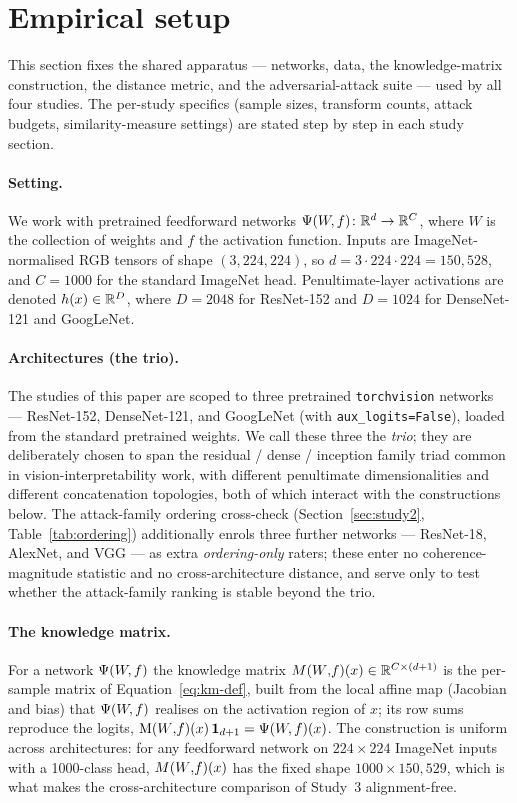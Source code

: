 \section{Empirical setup}
\label{sec:setup}

This section fixes the shared apparatus --- networks, data, the knowledge-matrix
construction, the distance metric, and the adversarial-attack suite --- used by
all four studies. The per-study specifics (sample sizes, transform counts, attack
budgets, similarity-measure settings) are stated step by step in each study
section.

\paragraph{Setting.}
We work with pretrained feedforward networks $\Psi(W\!,f) \colon \mathbb{R}^d \to \mathbb{R}^C$,
where $W$ is the collection of weights and $f$ the activation function.
Inputs are ImageNet-normalised RGB tensors of shape $(3, 224, 224)$,
so $d = 3 \cdot 224 \cdot 224 = 150{,}528$, and $C = 1000$ for the
standard ImageNet head. Penultimate-layer activations are denoted
$h(x) \in \mathbb{R}^D$, where $D = 2048$ for ResNet-152 and $D = 1024$ for
DenseNet-121 and GoogLeNet.

\paragraph{Architectures (the trio).}
The studies of this paper are scoped to three pretrained
\texttt{torchvision} networks --- ResNet-152, DenseNet-121, and GoogLeNet
(with \texttt{aux\_logits=False}), loaded from the standard pretrained
weights. We call these three the \emph{trio}; they are deliberately chosen
to span the residual / dense / inception family triad common in
vision-interpretability work, with different penultimate dimensionalities
and different concatenation topologies, both of which interact with the
constructions below. The attack-family ordering cross-check
(Section~\ref{sec:study2}, Table~\ref{tab:ordering}) additionally enrols
three further networks --- ResNet-18, AlexNet, and VGG --- as extra
\emph{ordering-only} raters; these enter no coherence-magnitude statistic
and no cross-architecture distance, and serve only to test whether the
attack-family ranking is stable beyond the trio.

\paragraph{The knowledge matrix.}
For a network $\Psi(W\!,f)$ the knowledge matrix
$M(W{,}f)(x) \in \mathbb{R}^{C \times (d+1)}$ is the per-sample matrix of
Equation~\ref{eq:km-def}, built from the local affine map (Jacobian and
bias) that $\Psi(W\!,f)$ realises on the activation region of $x$; its row sums
reproduce the logits, $\mathrm{M}(W{,}f)(x)\,\mathbf 1_{d+1} = \Psi(W\!,f)(x)$. The
construction is uniform across architectures: for any feedforward network
on $224\times224$ ImageNet inputs with a 1000-class head, $M(W{,}f)(x)$ has the
fixed shape $1000 \times 150{,}529$, which is what makes the
cross-architecture comparison of Study~3 alignment-free.

